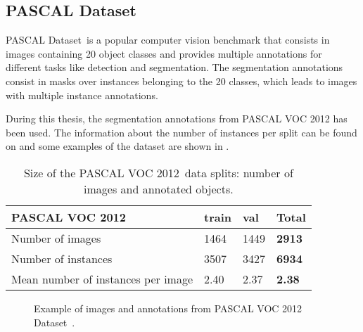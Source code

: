 \subsection{PASCAL Dataset}

PASCAL Dataset~\pascal is a popular computer vision benchmark that consists in images containing 20 object classes and provides multiple annotations for different tasks like detection and segmentation.
The segmentation annotations consist in masks over instances belonging to the 20 classes, which leads to images with multiple instance annotations.

During this thesis, the segmentation annotations from PASCAL VOC 2012 has been used.
The information about the number of instances per split can be found on  and some examples of the dataset are shown in .

\begin{table}[h]
  \centering
  \begin{tabular}{l|ll|l}
  \toprule
  PASCAL VOC 2012                    & train & val  & \textbf{Total} \\
  \midrule
  Number of images                   & 1464  & 1449 & \textbf{2913}  \\
  Number of instances                & 3507  & 3427 & \textbf{6934}  \\
  Mean number of instances per image & 2.40  & 2.37 & \textbf{2.38}  \\
  \bottomrule
  \end{tabular}
  \caption{Size of the PASCAL VOC 2012~\pascal data splits: number of images and annotated objects.}
  \label{tab:pascal}
\end{table}


\begin{figure}[h]
  \centering
  \caption{Example of images and annotations from PASCAL VOC 2012 Dataset~\pascal.}
  \label{fig:pascal}
\end{figure}



